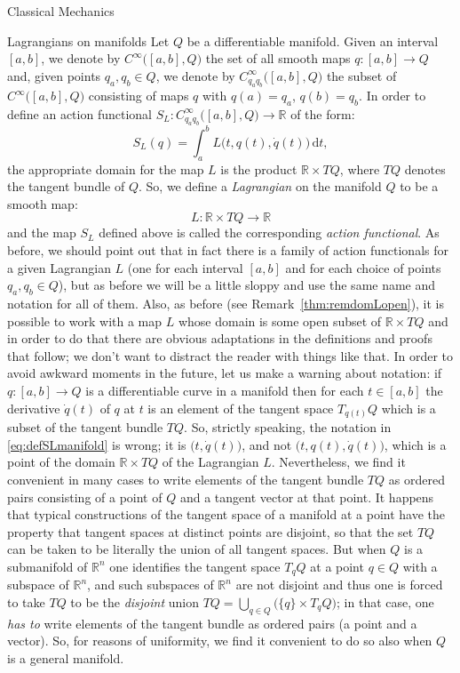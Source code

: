 \documentclass[oneside,a4paper,11pt]{amsbook}
\newcommand{\R}{\mathds R}
\newcommand{\dd}{\mathrm d}
\theoremstyle{remark}\newtheorem{exercise}{Exercise}[chapter]
\theoremstyle{plain}\newtheorem{teo}{Theorem}[section]
\theoremstyle{plain}\newtheorem{lem}[teo]{Lemma}
\theoremstyle{plain}\newtheorem{prop}[teo]{Proposition}
\theoremstyle{plain}\newtheorem{cor}[teo]{Corollary}
\theoremstyle{definition}\newtheorem{defin}[teo]{Definition}
\theoremstyle{remark}\newtheorem{rem}[teo]{Remark}
\theoremstyle{definition}\newtheorem{notation}[teo]{Notation}
\theoremstyle{definition}\newtheorem{convention}[teo]{Convention}
\theoremstyle{definition}\newtheorem{example}[teo]{Example}
\numberwithin{section}{chapter}
\numberwithin{equation}{section}
\begin{document}
\begin{chapter}{Classical Mechanics}
\begin{section}{Lagrangians on manifolds}
Let $Q$ be a differentiable manifold. Given an interval $[a,b]$, we denote by $C^\infty\big([a,b],Q\big)$ the set
of all smooth maps $q:[a,b]\to Q$ and, given points $q_a,q_b\in Q$, we denote by $C^\infty_{q_aq_b}\big([a,b],Q\big)$
the subset of $C^\infty\big([a,b],Q\big)$ consisting of maps $q$ with $q(a)=q_a$, $q(b)=q_b$. In order to define an action
functional $S_L:C^\infty_{q_aq_b}\big([a,b],Q\big)\to\R$ of the form:
\begin{equation}\label{eq:defSLmanifold}
S_L(q)=\int_a^bL\big(t,q(t),\dot q(t)\big)\,\dd t,
\end{equation}
the appropriate domain for the map $L$ is the product $\R\times TQ$, where $TQ$ denotes the tangent bundle of $Q$.
So, we define a {\em Lagrangian\/} on the manifold $Q$ to be a smooth map:
\[L:\R\times TQ\longrightarrow\R\]
and the map $S_L$ defined above is called the corresponding {\em action functional}. As before, we should point
out that in fact there is a family of action functionals for a given Lagrangian $L$ (one for each interval $[a,b]$
and for each choice of points $q_a,q_b\in Q$), but as before we will be a little sloppy and use the same name and notation
for all of them. Also, as before (see Remark~\ref{thm:remdomLopen}), it is possible to work with a map $L$ whose domain
is some open subset of $\R\times TQ$ and in order to do that there are obvious adaptations in the definitions and proofs
that follow; we don't want to distract the reader with things like that. In order to avoid awkward moments in the future,
let us make a warning about notation: if $q:[a,b]\to Q$ is a differentiable curve in a manifold then for each $t\in[a,b]$
the derivative $\dot q(t)$ of $q$ at $t$ is an element of the tangent space $T_{q(t)}Q$ which is a subset
of the tangent bundle $TQ$. So, strictly speaking, the notation in \eqref{eq:defSLmanifold} is wrong; it is
$\big(t,\dot q(t)\big)$, and not $\big(t,q(t),\dot q(t)\big)$, which is a point of the domain $\R\times TQ$ of the Lagrangian
$L$. Nevertheless, we find it convenient in many cases to write elements of the tangent bundle $TQ$ as ordered pairs
consisting of a point of $Q$ and a tangent vector at that point. It happens that typical constructions of the
tangent space of a manifold at a point have the property that tangent spaces at distinct points are disjoint, so that the set
$TQ$ can be taken to be literally the union of all tangent spaces. But when $Q$ is a submanifold of $\R^n$ one identifies
the tangent space $T_qQ$ at a point $q\in Q$ with a subspace of $\R^n$, and such subspaces of $\R^n$ are not disjoint
and thus one is forced to take $TQ$ to be the {\em disjoint\/} union $TQ=\bigcup_{q\in Q}\big(\{q\}\times T_qQ\big)$; in
that case, one {\em has to\/} write elements of the tangent bundle as ordered pairs (a point and a vector). So,
for reasons of uniformity, we find it convenient to do so also when $Q$ is a general manifold.


\end{section}
\end{chapter}
\end{document}
